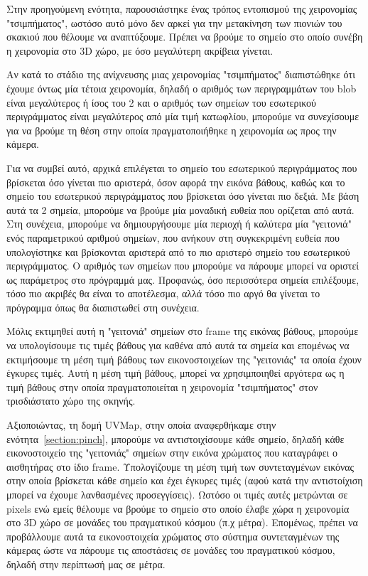 Στην προηγούμενη ενότητα, παρουσιάστηκε ένας τρόπος εντοπισμού της χειρονομίας "τσιμπήματος", ωστόσο αυτό μόνο δεν αρκεί για την μετακίνηση των πιονιών του σκακιού που θέλουμε να αναπτύξουμε. Πρέπει να βρούμε το σημείο στο οποίο συνέβη η χειρονομία στο 3D χώρο, με όσο μεγαλύτερη ακρίβεια γίνεται. 



Αν κατά το στάδιο της ανίχνευσης μιας χειρονομίας "τσιμπήματος" διαπιστώθηκε ότι έχουμε όντως μία τέτοια χειρονομία, δηλαδή ο αριθμός των περιγραμμάτων του blob είναι μεγαλύτερος ή ίσος του 2 και ο αριθμός των σημείων του εσωτερικού περιγράμματος είναι μεγαλύτερος από μία τιμή κατωφλίου, μπορούμε να συνεχίσουμε για να βρούμε τη θέση στην οποία πραγματοποιήθηκε η χειρονομία ως προς την κάμερα.

Για να συμβεί αυτό, αρχικά επιλέγεται το σημείο του εσωτερικού περιγράμματος που βρίσκεται όσο γίνεται πιο αριστερά, όσον αφορά την εικόνα βάθους, καθώς και το σημείο του εσωτερικού περιγράμματος που βρίσκεται όσο γίνεται πιο δεξιά. Με βάση αυτά τα 2 σημεία, μπορούμε να βρούμε μία μοναδική ευθεία που ορίζεται από αυτά. Στη συνέχεια, μπορούμε να δημιουργήσουμε μία περιοχή ή καλύτερα μία "γειτονιά"  ενός παραμετρικού αριθμού σημείων, που ανήκουν στη συγκεκριμένη ευθεία που υπολογίστηκε και βρίσκονται αριστερά από το πιο αριστερό σημείο του εσωτερικού περιγράμματος.  Ο αριθμός των σημείων που μπορούμε να πάρουμε μπορεί να οριστεί ως παράμετρος στο πρόγραμμά μας. Προφανώς, όσο περισσότερα σημεία επιλέξουμε, τόσο πιο ακριβές θα είναι το αποτέλεσμα, αλλά τόσο πιο αργό θα γίνεται το πρόγραμμα όπως θα διαπιστωθεί στη συνέχεια. 


Μόλις εκτιμηθεί αυτή η "γειτονιά" σημείων στο frame της εικόνας βάθους, μπορούμε να υπολογίσουμε τις τιμές βάθους για καθένα από αυτά τα σημεία και επομένως να εκτιμήσουμε τη μέση τιμή βάθους των εικονοστοιχείων της "γειτονιάς" τα οποία έχουν έγκυρες τιμές. Αυτή η μέση τιμή βάθους, μπορεί να χρησιμποιηθεί αργότερα ως η τιμή βάθους στην οποία πραγματοποιείται η χειρονομία "τσιμπήματος" στον τρισδιάστατο χώρο της σκηνής. 

Αξιοποιώντας, τη δομή UVMap, στην οποία αναφερθήκαμε στην ενότητα~\ref{section:pinch}, μπορούμε να αντιστοιχίσουμε κάθε σημείο, δηλαδή κάθε εικονοστοιχείο της "γειτονιάς" σημείων στην εικόνα χρώματος που καταγράφει ο αισθητήρας στο ίδιο frame. Υπολογίζουμε τη μέση τιμή των συντεταγμένων εικόνας στην οποία βρίσκεται κάθε σημείο και έχει έγκυρες τιμές (αφού κατά την αντιστοίχιση μπορεί να έχουμε λανθασμένες προσεγγίσεις). Ωστόσο οι τιμές αυτές μετρώνται σε pixels ενώ εμείς θέλουμε να βρούμε το σημείο στο οποίο έλαβε χώρα η χειρονομία στο 3D χώρο σε μονάδες του πραγματικού κόσμου (π.χ μέτρα). Επομένως, πρέπει να προβάλλουμε αυτά τα εικονοστοιχεία χρώματος στο σύστημα συντεταγμένων της κάμερας ώστε να πάρουμε τις αποστάσεις σε μονάδες του πραγματικού κόσμου, δηλαδή στην περίπτωσή μας σε μέτρα. 


